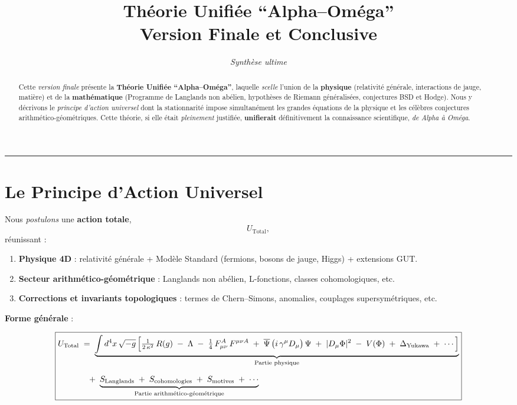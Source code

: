 \documentclass[11pt]{article}
\title{\textbf{Théorie Unifiée “Alpha--Oméga”\\
\large Version Finale et Conclusive}}
\author{\textit{Synthèse ultime}}
\date{}
\begin{document}
\maketitle

\begin{abstract}
Cette \emph{version finale} présente la \textbf{Théorie Unifiée “Alpha--Oméga”}, laquelle \emph{scelle} l'union de la \textbf{physique} (relativité générale, interactions de jauge, matière) et de la \textbf{mathématique} (Programme de Langlands non abélien, hypothèses de Riemann généralisées, conjectures BSD et Hodge). Nous y décrivons le \emph{principe d'action universel} dont la stationnarité impose simultanément les grandes équations de la physique et les célèbres conjectures arithmético-géométriques. Cette théorie, si elle était \emph{pleinement} justifiée, \textbf{unifierait} définitivement la connaissance scientifique, \emph{de Alpha à Oméga}.
\end{abstract}

\hrule
\vspace{6pt}

\section{Le Principe d'Action Universel}

Nous \emph{postulons} une \textbf{action totale}, 
\[
U_{\mathrm{Total}},
\]
réunissant :

\begin{enumerate}
  \item \textbf{Physique 4D} : relativité générale + Modèle Standard (fermions, bosons de jauge, Higgs) + extensions GUT.
  \item \textbf{Secteur arithmético-géométrique} : Langlands non abélien, L-fonctions, classes cohomologiques, etc.
  \item \textbf{Corrections et invariants topologiques} : termes de Chern--Simons, anomalies, couplages supersymétriques, etc.
\end{enumerate}

\noindent
\textbf{Forme générale} :

\[
\boxed{
\begin{aligned}
U_{\mathrm{Total}}
&\;=\;
\underbrace{\int d^4x\,\sqrt{-g}\,\Bigl[
\tfrac{1}{2\,\kappa^2}\,R(g)
\;-\;\Lambda
\;-\;\tfrac14\,F_{\mu\nu}^A\,F^{\mu\nu A}
\;+\;\overline{\Psi}\,\bigl(i\,\gamma^\mu D_\mu\bigr)\,\Psi
\;+\;|D_\mu \Phi|^2
\;-\;V(\Phi)
\;+\;\Delta_{\mathrm{Yukawa}}
\;+\;\cdots
\Bigr]}_{\text{Partie physique}}
\\[6pt]
&\quad+\;
\underbrace{S_{\mathrm{Langlands}}
\;+\;
S_{\text{cohomologies}}
\;+\;
S_{\text{motives}}
\;+\;\cdots}_{\text{Partie arithmético-géométrique}}
\end{aligned}
}
\]
\end{document}
